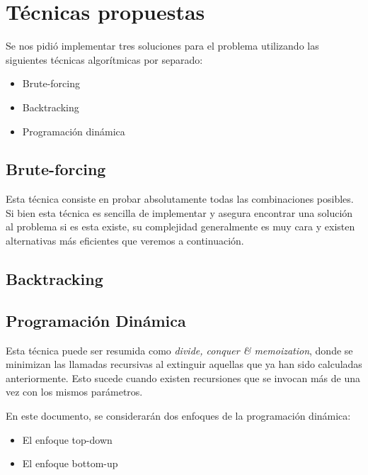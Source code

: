 \section{Técnicas propuestas}
Se nos pidió implementar tres soluciones para el problema utilizando las siguientes técnicas algorítmicas por separado:
\begin{itemize}
	\item Brute-forcing
	\item Backtracking
	\item Programación dinámica
\end{itemize}

\subsection{Brute-forcing}
Esta técnica consiste en probar absolutamente todas las combinaciones posibles. Si bien esta técnica es sencilla de implementar y asegura encontrar una solución al problema si es esta existe, su complejidad generalmente es muy cara y existen alternativas más eficientes que veremos a continuación.

\subsection{Backtracking}

\subsection{Programación Dinámica}
Esta técnica puede ser resumida como \textit{divide, conquer \& memoization}, donde se minimizan las llamadas recursivas al extinguir aquellas que ya han sido calculadas anteriormente. Esto sucede cuando existen recursiones que se invocan más de una vez con los mismos parámetros.

\vskip 8pt

En este documento, se considerarán dos enfoques de la programación dinámica:
\begin{itemize}
	\item El enfoque top-down
	\item El enfoque bottom-up
\end{itemize}
